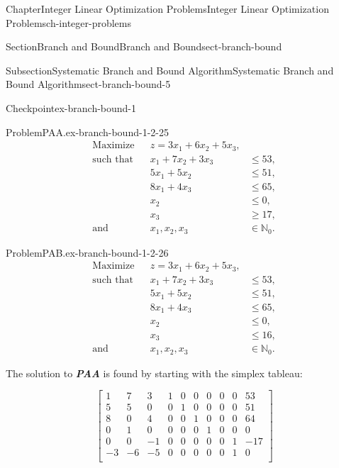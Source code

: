 \documentclass[oneside,10pt,]{book}
\newcommand{\alert}[1]{\textbf{\textit{#1}}}
\numberwithin{equation}{section}
\newcommand{\amp}{&}
\begin{document}
\begin{chapterptx}{Chapter}{Integer Linear Optimization Problems}{}{Integer Linear Optimization Problems}{}{}{ch-integer-problems}
\begin{sectionptx}{Section}{Branch and Bound}{}{Branch and Bound}{}{}{sect-branch-bound}
\begin{subsectionptx}{Subsection}{Systematic Branch and Bound Algorithm}{}{Systematic Branch and Bound Algorithm}{}{}{sect-branch-bound-5}
\begin{inlineexercise}{Checkpoint}{}{ex-branch-bound-1}
\begin{problem}{Problem}{PAA.}{ex-branch-bound-1-2-25}
\begin{equation*}
\begin{aligned} \text{Maximize} \amp\amp z = 3x_1 +6x_2 + 5 x_3, \amp\\ \text{such that} \amp\amp x_1 + 7 x_2 + 3x_3 \amp \leq 53, \\ \amp\amp 5 x_1 + 5 x_2 \amp \leq 51, \\ \amp\amp 8 x_1 + 4x_3 \amp \leq 65, \\ \amp\amp x_2 \amp \leq 0, \\ \amp \amp x_3 \amp \geq 17, \\ \text{and} \amp\amp x_1, x_2, x_3 \amp \in \mathbb{N}_{0}.
\end{aligned}
\end{equation*}
%
\end{problem}
\begin{problem}{Problem}{PAB.}{ex-branch-bound-1-2-26}%
%
\begin{equation*}
\begin{aligned} \text{Maximize} \amp\amp z = 3x_1 +6x_2 + 5 x_3, \amp\\ \text{such that} \amp\amp x_1 + 7 x_2 + 3x_3 \amp \leq 53, \\ \amp\amp 5 x_1 + 5 x_2 \amp \leq 51, \\ \amp\amp 8 x_1 + 4x_3 \amp \leq 65, \\ \amp\amp x_2 \amp \leq 0, \\ \amp \amp x_3 \amp \leq 16, \\ \text{and} \amp\amp x_1, x_2, x_3 \amp \in \mathbb{N}_{0}.
\end{aligned}
\end{equation*}
%
\end{problem}
The solution to \alert{PAA} is found by starting with the simplex tableau:%
\par
%
\begin{equation*}
\left[\begin{array}{rrr|rrrrrr|r} 1 \amp 7 \amp 3 \amp 1 \amp 0 \amp 0 \amp 0 \amp 0 \amp 0 \amp 53\\ 5 \amp 5 \amp 0 \amp 0 \amp 1 \amp 0 \amp 0 \amp 0 \amp 0 \amp 51\\ 8 \amp 0 \amp 4 \amp 0 \amp 0 \amp 1 \amp 0 \amp 0 \amp 0 \amp 64\\ 0 \amp 1 \amp 0 \amp 0 \amp 0 \amp 0 \amp 1 \amp 0 \amp 0 \amp 0\\ 0 \amp 0 \amp -1 \amp 0 \amp 0 \amp 0 \amp 0 \amp 0 \amp 1 \amp -17\\ \hline -3 \amp -6 \amp -5 \amp 0 \amp 0 \amp 0 \amp 0 \amp 0 \amp 1 \amp 0\\ \end{array} \right]

\end{equation*}
\end{inlineexercise}
\end{subsectionptx}
\end{sectionptx}
\end{chapterptx}
\end{document}
